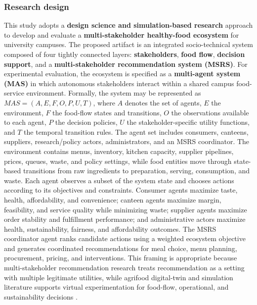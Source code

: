 \subsubsection{Research design}\label{research-design}

This study adopts a \textbf{design science and simulation-based
research} approach to develop and evaluate a \textbf{multi-stakeholder
healthy-food ecosystem} for university campuses. The proposed artifact
is an integrated socio-technical system composed of four tightly
connected layers: \textbf{stakeholders}, \textbf{food flow},
\textbf{decision support}, and a \textbf{multi-stakeholder
recommendation system (MSRS)}. For experimental evaluation, the
ecosystem is specified as a \textbf{multi-agent system (MAS)} in which
autonomous stakeholders interact within a shared campus food-service
environment. Formally, the system may be represented as
\(MAS = (A, E, F, O, P, U, T)\), where \(A\) denotes the set of agents,
\(E\) the environment, \(F\) the food-flow states and transitions, \(O\)
the observations available to each agent, \(P\) the decision policies,
\(U\) the stakeholder-specific utility functions, and \(T\) the temporal
transition rules. The agent set includes consumers, canteens, suppliers,
research/policy actors, administrators, and an MSRS coordinator. The
environment contains menus, inventory, kitchen capacity, supplier
pipelines, prices, queues, waste, and policy settings, while food
entities move through state-based transitions from raw ingredients to
preparation, serving, consumption, and waste. Each agent observes a
subset of the system state and chooses actions according to its
objectives and constraints. Consumer agents maximize taste, health,
affordability, and convenience; canteen agents maximize margin,
feasibility, and service quality while minimizing waste; supplier agents
maximize order stability and fulfillment performance; and administrative
actors maximize health, sustainability, fairness, and affordability
outcomes. The MSRS coordinator agent ranks candidate actions using a
weighted ecosystem objective and generates coordinated recommendations
for meal choice, menu planning, procurement, pricing, and interventions.
This framing is appropriate because multi-stakeholder recommendation
research treats recommendation as a setting with multiple legitimate
utilities, while agrifood digital-twin and simulation literature
supports virtual experimentation for food-flow, operational, and
sustainability decisions
\citep{zheng2017msr, abdollahpouri2019fairness, wu2021multifr}.

